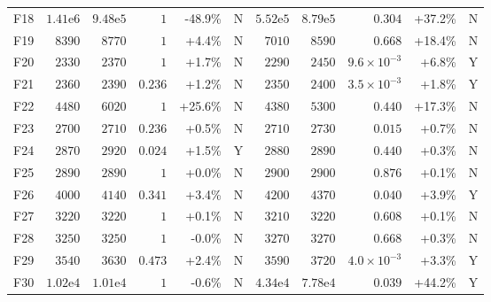 \begin{tabular}{lrrrrcrrrrc}
F18 & $1.41\mathrm{e}{6}$ & $9.48\mathrm{e}{5}$ & $1$ & -48.9\% & N & $5.52\mathrm{e}{5}$ & $8.79\mathrm{e}{5}$ & $0.304$ & +37.2\% & N \\
F19 & $8390$ & $8770$ & $1$ & +4.4\% & N & $7010$ & $8590$ & $0.668$ & +18.4\% & N \\
F20 & $2330$ & $2370$ & $1$ & +1.7\% & N & $2290$ & $2450$ & $9.6\times10^{-3}$ & +6.8\% & Y \\
F21 & $2360$ & $2390$ & $0.236$ & +1.2\% & N & $2350$ & $2400$ & $3.5\times10^{-3}$ & +1.8\% & Y \\
F22 & $4480$ & $6020$ & $1$ & +25.6\% & N & $4380$ & $5300$ & $0.440$ & +17.3\% & N \\
F23 & $2700$ & $2710$ & $0.236$ & +0.5\% & N & $2710$ & $2730$ & $0.015$ & +0.7\% & N \\
F24 & $2870$ & $2920$ & $0.024$ & +1.5\% & Y & $2880$ & $2890$ & $0.440$ & +0.3\% & N \\
F25 & $2890$ & $2890$ & $1$ & +0.0\% & N & $2900$ & $2900$ & $0.876$ & +0.1\% & N \\
F26 & $4000$ & $4140$ & $0.341$ & +3.4\% & N & $4200$ & $4370$ & $0.040$ & +3.9\% & Y \\
F27 & $3220$ & $3220$ & $1$ & +0.1\% & N & $3210$ & $3220$ & $0.608$ & +0.1\% & N \\
F28 & $3250$ & $3250$ & $1$ & -0.0\% & N & $3270$ & $3270$ & $0.668$ & +0.3\% & N \\
F29 & $3540$ & $3630$ & $0.473$ & +2.4\% & N & $3590$ & $3720$ & $4.0\times10^{-3}$ & +3.3\% & Y \\
F30 & $1.02\mathrm{e}{4}$ & $1.01\mathrm{e}{4}$ & $1$ & -0.6\% & N & $4.34\mathrm{e}{4}$ & $7.78\mathrm{e}{4}$ & $0.039$ & +44.2\% & Y \\
\bottomrule
\end{tabular}
